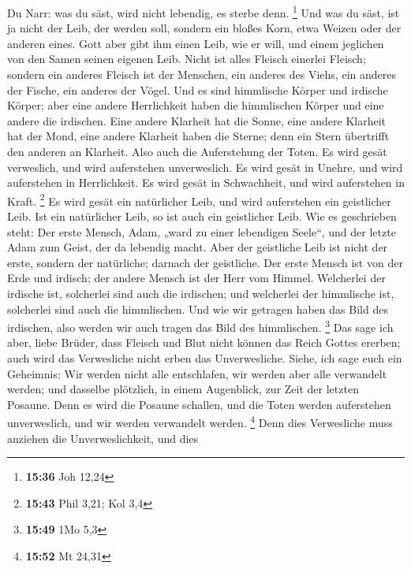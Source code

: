 Du Narr: was du säst, wird nicht lebendig, es sterbe
denn. \footnote{\textbf{15:36} Joh 12,24}  Und was du
säst, ist ja nicht der Leib, der werden soll, sondern ein bloßes Korn,
etwa Weizen oder der anderen eines.  Gott aber gibt ihm
einen Leib, wie er will, und einem jeglichen von den Samen seinen
eigenen Leib.  Nicht ist alles Fleisch einerlei Fleisch;
sondern ein anderes Fleisch ist der Menschen, ein anderes des Viehs, ein
anderes der Fische, ein anderes der Vögel.  Und es sind
himmlische Körper und irdische Körper; aber eine andere Herrlichkeit
haben die himmlischen Körper und eine andere die irdischen.
 Eine andere Klarheit hat die Sonne, eine andere Klarheit
hat der Mond, eine andere Klarheit haben die Sterne; denn ein Stern
übertrifft den anderen an Klarheit.  Also auch die
Auferstehung der Toten. Es wird gesät verweslich, und wird auferstehen
unverweslich.  Es wird gesät in Unehre, und wird
auferstehen in Herrlichkeit. Es wird gesät in Schwachheit, und wird
auferstehen in Kraft. \footnote{\textbf{15:43} Phil 3,21; Kol 3,4}
 Es wird gesät ein natürlicher Leib, und wird auferstehen
ein geistlicher Leib. Ist ein natürlicher Leib, so ist auch ein
geistlicher Leib.  Wie es geschrieben steht: Der erste
Mensch, Adam, „ward zu einer lebendigen Seele``, und der letzte Adam zum
Geist, der da lebendig macht.  Aber der geistliche Leib
ist nicht der erste, sondern der natürliche; darnach der geistliche.
 Der erste Mensch ist von der Erde und irdisch; der
andere Mensch ist der Herr vom Himmel.  Welcherlei der
irdische ist, solcherlei sind auch die irdischen; und welcherlei der
himmlische ist, solcherlei sind auch die himmlischen. 
Und wie wir getragen haben das Bild des irdischen, also werden wir auch
tragen das Bild des himmlischen. \footnote{\textbf{15:49} 1Mo 5,3}
 Das sage ich aber, liebe Brüder, dass Fleisch und Blut
nicht können das Reich Gottes ererben; auch wird das Verwesliche nicht
erben das Unverwesliche.  Siehe, ich sage euch ein
Geheimnis: Wir werden nicht alle entschlafen, wir werden aber alle
verwandelt werden;  und dasselbe plötzlich, in einem
Augenblick, zur Zeit der letzten Posaune. Denn es wird die Posaune
schallen, und die Toten werden auferstehen unverweslich, und wir werden
verwandelt werden. \footnote{\textbf{15:52} Mt 24,31} 
Denn dies Verwesliche muss anziehen die Unverweslichkeit, und dies
